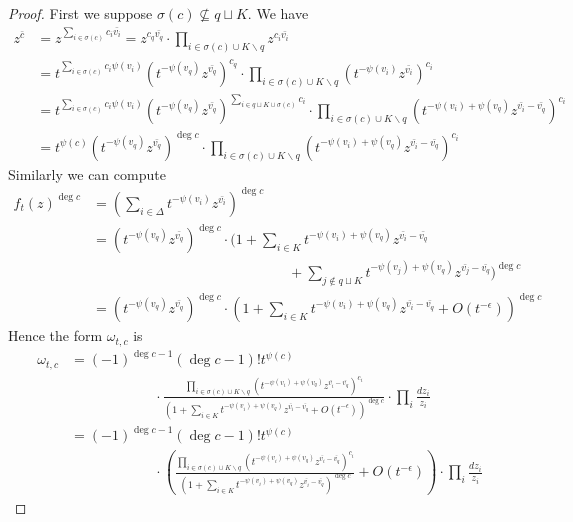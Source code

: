 \documentclass[11pt,reqno]{amsart}
\theoremstyle{definition}
\numberwithin{equation}{section}
\begin{document}
\begin{proof}
First we suppose $\sigma(c)\not\subseteq q\sqcup K$. We have
	\begin{align*}
	z^{\bar{c}}&=z^{\sum_{i\in \sigma(c)}c_i \bar{v_i}}=z^{c_q \bar{v_q}}\cdot\prod_{i\in \sigma(c)\cup K\backslash q}z^{c_i \bar{v_i}}\\
&=t^{\sum_{i\in \sigma(c)}c_i\psi(v_i)}(t^{-\psi(v_q)}z^{\bar{v_q}})^{c_q}\cdot\prod_{i\in \sigma(c)\cup K\backslash q}(t^{-\psi(v_i)}z^{\bar{v_i}})^{c_i}\\
&=t^{\sum_{i\in \sigma(c)}c_i\psi(v_i)}(t^{-\psi(v_q)}z^{\bar{v_q}})^{\sum_{i\in q\sqcup K\cup\sigma(c)}c_i}\cdot\prod_{i\in \sigma(c)\cup K\backslash q}(t^{-\psi(v_i)+\psi(v_q)}z^{\bar{v_i}-\bar{v_q}})^{c_i}\\
&=t^{\psi(c)}(t^{-\psi(v_q)}z^{\bar{v_q}})^{\deg c}\cdot\prod_{i\in \sigma(c)\cup K\backslash q}(t^{-\psi(v_i)+\psi(v_q)}z^{\bar{v_i}-\bar{v_q}})^{c_i}
\end{align*}
Similarly we can compute
\begin{align*}
	f_t(z)^{\deg c}&=(\sum_{i\in\Delta}t^{-\psi(v_i)}z^{\bar{v_i}})^{\deg c}\\
	&=(t^{-\psi(v_q)}z^{\bar{v_q}})^{\deg c}\cdot\Bigg(1+\sum_{i\in K}t^{-\psi(v_i)+\psi(v_q)}z^{\bar{v_i}-\bar{v_q}} \\ 
	&\qquad\qquad\qquad\qquad\qquad\qquad\qquad +\sum_{j\not\in q\sqcup K}t^{-\psi(v_j)+\psi(v_q)}z^{\bar{v_j}-\bar{v_q}}\Bigg)^{\deg c}\\
	&=(t^{-\psi(v_q)}z^{\bar{v_q}})^{\deg c}\cdot\left(1+\sum_{i\in K}t^{-\psi(v_i)+\psi(v_q)}z^{\bar{v_i}-\bar{v_q}}+O(t^{-\epsilon})\right)^{\deg c}
\end{align*}
Hence the form $\omega_{t,c}$ is
\begin{align*}
	\omega_{t,c}&=(-1)^{\deg c-1}(\deg c-1)!t^{\psi(c)} \\ 
	& \qquad\qquad\qquad \cdot\frac{\prod_{i\in \sigma(c)\cup K\backslash q}(t^{-\psi(v_i)+\psi(v_q)}z^{\bar{v_i}-\bar{v_q}})^{c_i}}{\left(1+\sum_{i\in K}t^{-\psi(v_i)+\psi(v_q)}z^{\bar{v_i}-\bar{v_q}}+O(t^{-\epsilon})\right)^{\deg c}}\cdot\prod_{i}\frac{dz_i}{z_i}\\
	&=(-1)^{\deg c-1}(\deg c-1)!t^{\psi(c)}\\
	&\qquad\qquad\qquad \cdot\left(\frac{\prod_{i\in \sigma(c)\cup K\backslash q}(t^{-\psi(v_i)+\psi(v_q)}z^{\bar{v_i}-\bar{v_q}})^{c_i}}{\left(1+\sum_{i\in K}t^{-\psi(v_i)+\psi(v_q)}z^{\bar{v_i}-\bar{v_q}}\right)^{\deg c}}+O(t^{-\epsilon})\right)\cdot\prod_{i}\frac{dz_i}{z_i}
\end{align*}

\end{proof}
\end{document}
